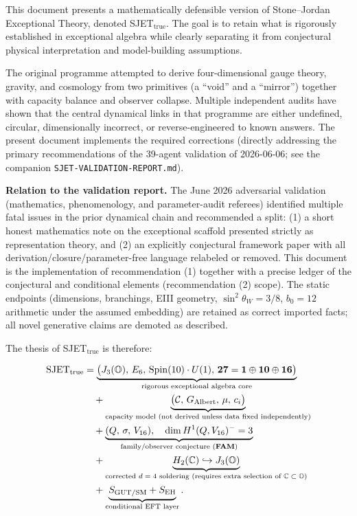 \documentclass[11pt]{article}
\theoremstyle{plain}
\theoremstyle{definition}
\theoremstyle{remark}
\numberwithin{equation}{section}
\newcommand{\Spin}{\mathrm{Spin}}
\begin{document}
This document presents a mathematically defensible version of Stone--Jordan Exceptional Theory, denoted SJET$_{\mathrm{true}}$. The goal is to retain what is rigorously established in exceptional algebra while clearly separating it from conjectural physical interpretation and model-building assumptions.

The original programme attempted to derive four-dimensional gauge theory, gravity, and cosmology from two primitives (a ``void'' and a ``mirror'') together with capacity balance and observer collapse. Multiple independent audits have shown that the central dynamical links in that programme are either undefined, circular, dimensionally incorrect, or reverse-engineered to known answers. The present document implements the required corrections (directly addressing the primary recommendations of the 39-agent validation of 2026-06-06; see the companion \texttt{SJET-VALIDATION-REPORT.md}).

\textbf{Relation to the validation report.} The June 2026 adversarial validation (mathematics, phenomenology, and parameter-audit referees) identified multiple fatal issues in the prior dynamical chain and recommended a split: (1) a short honest mathematics note on the exceptional scaffold presented strictly as representation theory, and (2) an explicitly conjectural framework paper with all derivation/closure/parameter-free language relabeled or removed. This document is the implementation of recommendation (1) together with a precise ledger of the conjectural and conditional elements (recommendation (2) scope). The static endpoints (dimensions, branchings, EIII geometry, $\sin^2\theta_W=3/8$, $b_0=12$ arithmetic under the assumed embedding) are retained as correct imported facts; all novel generative claims are demoted as described.

The thesis of SJET$_{\mathrm{true}}$ is therefore:

\[
\begin{aligned}
\text{SJET}_{\mathrm{true}}
&=
\underbrace{
\bigl(J_3(\mathbb{O}),\,E_6,\,\Spin(10)\cdot U(1),\,\mathbf{27}=\mathbf{1}\oplus\mathbf{10}\oplus\mathbf{16}\bigr)
}_{\text{rigorous exceptional algebra core}}
\\
&\quad+
\underbrace{
\bigl(\mathcal{C},\,G_{\mathrm{Albert}},\,\mu,\,c_i\bigr)
}_{\text{capacity model (not derived unless data fixed independently)}}
\\
&\quad+
\underbrace{
(Q,\,\sigma,\,V_{16}),\quad \dim H^1(Q,V_{16})^{-}=3
}_{\text{family/observer conjecture (\textbf{FAM})}}
\\
&\quad+
\underbrace{
H_2(\mathbb{C})\hookrightarrow J_3(\mathbb{O})
}_{\text{corrected $d=4$ soldering (requires extra selection of $\mathbb{C}\subset\mathbb{O}$)}}
\\
&\quad+
\underbrace{
S_{\mathrm{GUT/SM}}+S_{\mathrm{EH}}
}_{\text{conditional EFT layer}}.
\end{aligned}
\]
\end{document}
